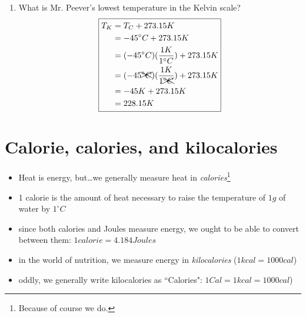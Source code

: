 \documentclass[11pt, oneside]{article}   	%
\begin{document}
\begin{enumerate}[label=Example \arabic*]
  \item What is Mr. Peever's lowest temperature in the Kelvin scale?
\begin{equation} 
\boxed{
\begin{split}
    T_K  &= T_C + 273.15 K \\
             &= -45 ^{\circ} C +  273.15 K \\
             &= (-45 ^{\circ} C)(\frac{1 K}{1 ^{\circ}C}) +  273.15 K \\
             &= (-45 \xcancel{^{\circ} C})(\frac{1 K}{1 \xcancel{^{\circ}C}}) +  273.15 K \\
             &= -45 K +  273.15 K \\
             &= 228.15 K \\
 \end{split}
 }
 \end{equation}
 
 \end{enumerate}

\section{Calorie, calories, and kilocalories}
\begin{itemize}
\item Heat is energy, but\ldots we generally measure heat in \emph{calories}\footnote{Because of course we do.}
\item 1 calorie is the amount of heat necessary to raise the temperature of $1g$ of water by $1^{\circ} C$
\item since both calories and Joules measure energy, we ought to be able to convert between them: $1 calorie = 4.184 Joules$ \cite[p. 48]{wile-chem-2}
\item in the world of nutrition, we measure energy in \emph{kilocalories} ($1 kcal = 1000 cal$)
\item oddly, we generally write kilocalories as ``Calories": $1 Cal = 1 kcal = 1000 cal$)
\end{itemize}
\end{document}
